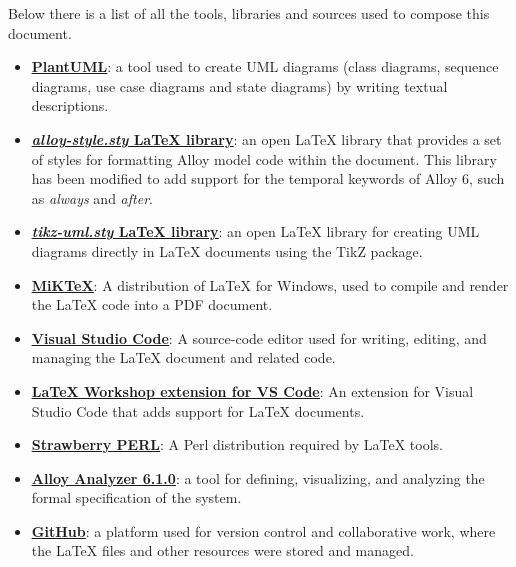 Below there is a list of all the tools, libraries and sources used to compose this document.
\begin{itemize}
    \item \underline{\textbf{\href{https://plantuml.com}{PlantUML}}}: a tool used to create UML diagrams (class diagrams, sequence diagrams, use case diagrams and state diagrams) by writing textual descriptions.
    \item \underline{\textbf{\href{https://github.com/Angtrim/alloy-latex-highlighting}{\textit{alloy-style.sty} LaTeX library}}}: an open LaTeX library that provides a set of styles for formatting Alloy model code within the document. This library has been modified to add support for the temporal keywords of Alloy 6, such as \textit{always} and \textit{after}.
    \item \underline{\textbf{\href{https://www.overleaf.com/latex/templates/uml-diagrams-with-tikz-uml/ftfzzpmwnjqw}{\textit{tikz-uml.sty} LaTeX library}}}: an open LaTeX library for creating UML diagrams directly in LaTeX documents using the TikZ package.
    \item \underline{\textbf{\href{https://miktex.org}{MiKTeX}}}: A distribution of LaTeX for Windows, used to compile and render the LaTeX code into a PDF document.
    \item \underline{\textbf{\href{https://code.visualstudio.com}{Visual Studio Code}}}: A source-code editor used for writing, editing, and managing the LaTeX document and related code.
    \item \underline{\textbf{\href{https://marketplace.visualstudio.com/items?itemName=James-Yu.latex-workshop}{LaTeX Workshop extension for VS Code}}}: An extension for Visual Studio Code that adds support for LaTeX documents.
    \item \underline{\textbf{\href{https://strawberryperl.com}{Strawberry PERL}}}: A Perl distribution required by LaTeX tools.
    \item \underline{\textbf{\href{https://alloytools.org}{Alloy Analyzer 6.1.0}}}: a tool for defining, visualizing, and analyzing the formal specification of the system.
    \item \underline{\textbf{\href{https://github.com}{GitHub}}}: a platform used for version control and collaborative work, where the LaTeX files and other resources were stored and managed.
\end{itemize}
